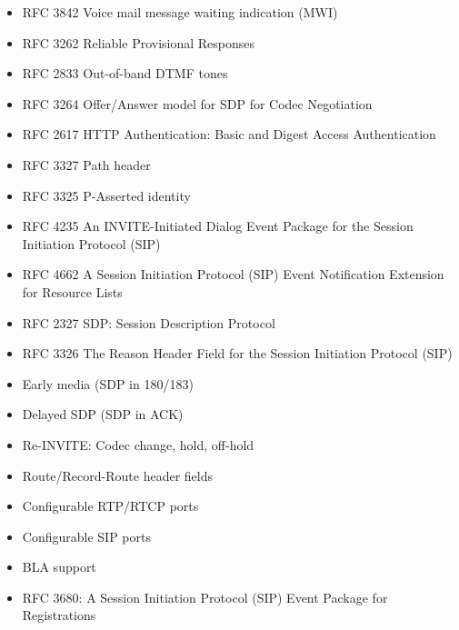 \documentclass[letterpaper,10pt,english]{sphinxmanual}
\begin{document}
\begin{itemize}
\item {} 
RFC 3842 Voice mail message waiting indication (MWI)

\item {} 
RFC 3262 Reliable Provisional Responses

\item {} 
RFC 2833 Out-of-band DTMF tones

\item {} 
RFC 3264 Offer/Answer model for SDP for Codec Negotiation

\item {} 
RFC 2617 HTTP Authentication: Basic and Digest Access Authentication

\item {} 
RFC 3327 Path header

\item {} 
RFC 3325 P-Asserted identity

\item {} 
RFC 4235 An INVITE-Initiated Dialog Event Package for the Session Initiation Protocol (SIP)

\item {} 
RFC 4662 A Session Initiation Protocol (SIP) Event Notification Extension for Resource Lists

\item {} 
RFC 2327 SDP: Session Description Protocol

\item {} 
RFC 3326 The Reason Header Field for the Session Initiation Protocol (SIP)

\item {} 
Early media (SDP in 180/183)

\item {} 
Delayed SDP (SDP in ACK)

\item {} 
Re-INVITE: Codec change, hold, off-hold

\item {} 
Route/Record-Route header fields

\item {} 
Configurable RTP/RTCP ports

\item {} 
Configurable SIP ports

\item {} 
BLA support

\item {} 
RFC 3680: A Session Initiation Protocol (SIP) Event Package for Registrations


\end{itemize}
\end{document}
